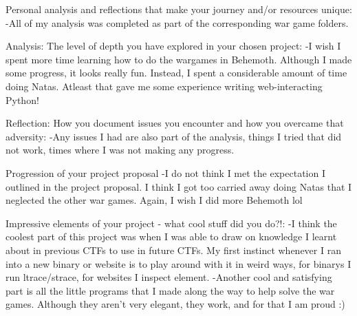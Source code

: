 \documentclass{article}
\begin{document}
Personal analysis and reflections that make your journey and/or resources unique:
	-All of my analysis was completed as part of the corresponding war game folders.

Analysis: The level of depth you have explored in your chosen project:
	-I wish I spent more time learning how to do the wargames in Behemoth. Although I made some progress, it looks really fun. Instead, I spent a considerable amount of time doing Natas. Atleast that gave me some experience writing web-interacting Python!
	
Reflection: How you document issues you encounter and how you overcame that adversity:
	-Any issues I had are also part of the analysis, things I tried that did not work, times where I was not making any progress.

Progression of your project proposal
	-I do not think I met the expectation I outlined in the project proposal. I think I got too carried away doing Natas that I neglected the other war games. Again, I wish I did more Behemoth lol

Impressive elements of your project - what cool stuff did you do?!:
	-I think the coolest part of this project was when I was able to draw on knowledge I learnt about in previous CTFs to use in future CTFs. My first instinct whenever I ran into a new binary or website is to play around with it in weird ways, for binarys I run ltrace/strace, for websites I inspect element.
	-Another cool and satisfying part is all the little programs that I made along the way to help solve the war games. Although they aren't very elegant, they work, and for that I am proud :)
\end{document}
